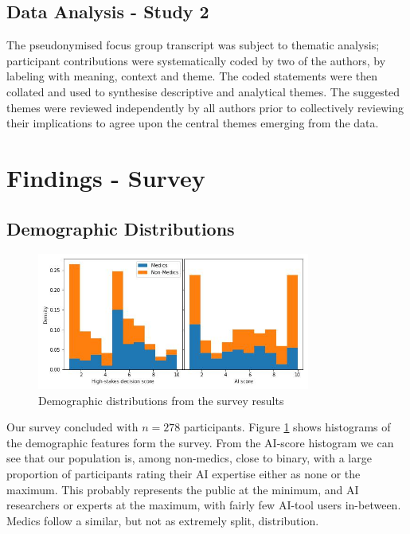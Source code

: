 \documentclass[manuscript,screen,review]{acmart}
\begin{document}
\subsection{Data Analysis - Study 2}
\label{study2_data_analysis}

The pseudonymised focus group transcript was subject to thematic analysis; participant contributions were systematically coded by two of the authors, by labeling with meaning, context and theme. The coded statements were then collated and used to synthesise descriptive and analytical themes. The suggested themes were reviewed independently by all authors prior to collectively reviewing their implications to agree upon the central themes emerging from the data.    



\newpage
\section{Findings - Survey}

\subsection{Demographic Distributions}

\begin{figure}[h]
    \centering
    \includegraphics[width = 0.8\textwidth]{graphics/distributions.jpg}
    \caption{Demographic distributions from the survey results}
    \label{fig:distributions}
\end{figure}

Our survey concluded with $n = 278$ participants. Figure \ref{fig:distributions} shows histograms of the demographic features form the survey. From the AI-score histogram we can see that our population is, among non-medics, close to binary, with a large proportion of participants rating their AI expertise either as none or the maximum. This probably represents the public at the minimum, and AI researchers or experts at the maximum, with fairly few AI-tool users in-between. Medics follow a similar, but not as extremely split, distribution.
\end{document}
